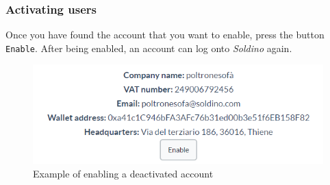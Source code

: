 		\subsubsection{Activating users}
		Once you have found the account that you want to enable, press the button 
		\texttt{Enable}. After being enabled, an account can log onto 
		\textit{Soldino} again.
		\begin{figure}[H]
			\includegraphics[width=15cm]{res/images/user_enable.png}
			\centering
			\caption{Example of enabling a deactivated account}
		\end{figure}
